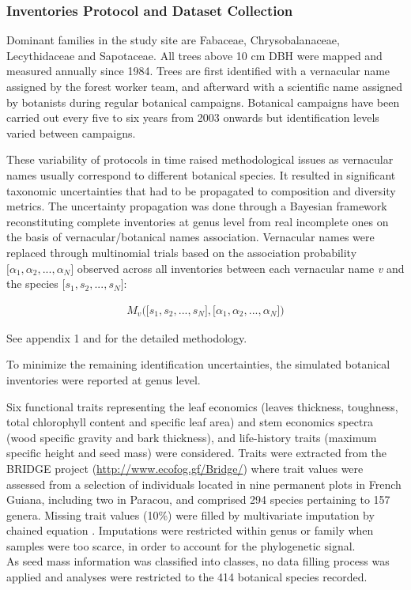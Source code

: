 \documentclass[
  11pt,
  french,
  A4paper,
  extrafontsizes,onecolumn,openright
  ]{memoir}
\begin{document}
\endgroup{}

\subsubsection{Inventories Protocol and Dataset
Collection}\label{inventories-protocol-and-dataset-collection-1}

Dominant families in the study site are Fabaceae, Chrysobalanaceae,
Lecythidaceae and Sapotaceae. All trees above 10 cm DBH were mapped and
measured annually since 1984. Trees are first identified with a
vernacular name assigned by the forest worker team, and afterward with a
scientific name assigned by botanists during regular botanical
campaigns. Botanical campaigns have been carried out every five to six
years from 2003 onwards but identification levels varied between
campaigns.

These variability of protocols in time raised methodological issues as
vernacular names usually correspond to different botanical species. It
resulted in significant taxonomic uncertainties that had to be
propagated to composition and diversity metrics. The uncertainty
propagation was done through a Bayesian framework reconstituting
complete inventories at genus level from real incomplete ones on the
basis of vernacular/botanical names association. Vernacular names were
replaced through multinomial trials based on the association probability
\(\big[\alpha_1, \alpha_2,..., \alpha_N\big]\) observed across all
inventories between each vernacular name \emph{v} and the species
\(\big[s_1, s_2,..., s_N\big]\):

\begin{align}
M_v\Big(\big[s_1, s_2,..., s_N\big],\big[\alpha_1, \alpha_2,..., \alpha_N\big]\Big) \nonumber
\end{align}

See appendix 1 and \textcite{Aubry-Kientz2013} for the detailed
methodology.

To minimize the remaining identification uncertainties, the simulated
botanical inventories were reported at genus level.

Six functional traits representing the leaf economics (leaves thickness,
toughness, total chlorophyll content and specific leaf area) and stem
economics spectra (wood specific gravity and bark thickness), and
life-history traits (maximum specific height and seed mass) were
considered. Traits were extracted from the BRIDGE project
(\url{http://www.ecofog.gf/Bridge/}) where trait values were assessed
from a selection of individuals located in nine permanent plots in
French Guiana, including two in Paracou, and comprised 294 species
pertaining to 157 genera. Missing trait values (10\%) were filled by
multivariate imputation by chained equation \autocite{Mice2011}.
Imputations were restricted within genus or family when samples were too
scarce, in order to account for the phylogenetic signal.\\
As seed mass information was classified into classes, no data filling
process was applied and analyses were restricted to the 414 botanical
species recorded.
\end{document}
